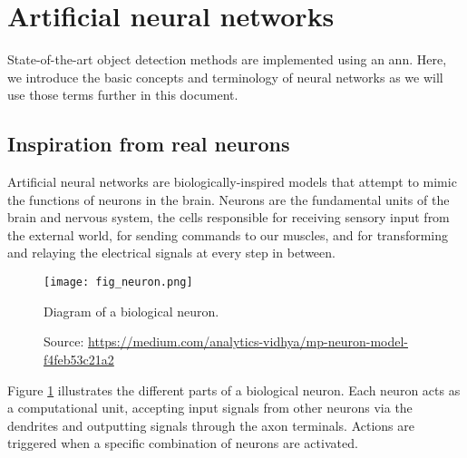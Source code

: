 \section{Artificial neural networks}
State-of-the-art object detection methods are implemented using an \acrfull{ann}. Here, we introduce the basic concepts and terminology of neural networks as we will use those terms further in this document. 

\subsection{Inspiration from real neurons}
Artificial neural networks are biologically-inspired models that attempt to mimic the functions of neurons in the brain. Neurons are the fundamental units of the brain and nervous system, the cells responsible for receiving sensory input from the external world, for sending commands to our muscles, and for transforming and relaying the electrical signals at every step in between.
\begin{figure}[ht]
    \texttt{[image: fig\_neuron.png]}
    \caption[Diagram of a biological neuron]{Diagram of a biological neuron.}
    \caption*{Source: \href{ https://medium.com/analytics-vidhya/mp-neuron-model-f4feb53c21a2}{https://medium.com/analytics-vidhya/mp-neuron-model-f4feb53c21a2}}
    \label{fig:neuron}
\end{figure}
Figure \ref{fig:neuron} illustrates the different parts of a biological neuron.
Each neuron acts as a computational unit, accepting input signals from other neurons via the dendrites and outputting signals through the axon terminals. Actions are triggered when a specific combination of neurons are activated.

